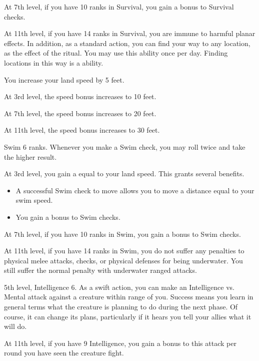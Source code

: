     At 7th level, if you have 10 ranks in Survival, you gain a  bonus to Survival checks.

    At 11th level, if you have 14 ranks in Survival, you are immune to harmful planar effects.
    In addition, as a standard action, you can find your way to any location, as the effect of the  ritual.
    You may use this ability once per day.
    Finding locations in this way is a  ability.

    \featben You increase your land speed by 5 feet.

    At 3rd level, the speed bonus increases to 10 feet.

    At 7th level, the speed bonus increases to 20 feet.

    At 11th level, the speed bonus increases to 30 feet.

    \featpre Swim 6 ranks.
    \featben Whenever you make a Swim check, you may roll twice and take the higher result.

    At 3rd level, you gain a  equal to your land speed.
    This grants several benefits.
    \begin{itemize}
        \item A successful Swim check to move allows you to move a distance equal to your swim speed.
        \item You gain a  bonus to Swim checks.
    \end{itemize}

    At 7th level, if you have 10 ranks in Swim, you gain a  bonus to Swim checks.

    At 11th level, if you have 14 ranks in Swim, you do not suffer any penalties to physical melee attacks, checks, or physical defenses for being underwater.
    You still suffer the normal penalty with underwater ranged attacks.

    \featpres 5th level, Intelligence 6.
    \featben As a swift action, you can make an Intelligence vs. Mental attack against a creature within \rngmed range of you.
    Success means you learn in general terms what the creature is planning to do during the next phase.
    Of course, it can change its plans, particularly if it hears you tell your allies what it will do.

    At 11th level, if you have 9 Intelligence, you gain a  bonus to this attack per round you have seen the creature fight.

